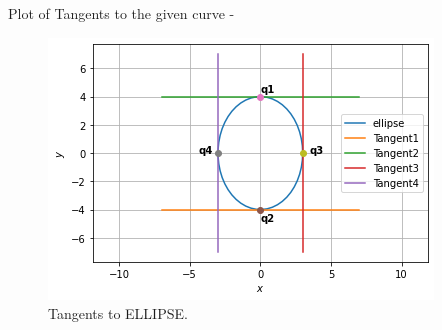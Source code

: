 \documentclass[journal,12pt,twocolumn]{IEEEtran}
\begin{document}
Plot of Tangents to the given curve -
\begin{figure}[!ht]
    \centering
    \includegraphics[width=\columnwidth]{ELLIPSE.png}
    \caption{Tangents to ELLIPSE.}
    \label{fig:Tangent to ELLIPSE.}
\end{figure}  
\end{document}
